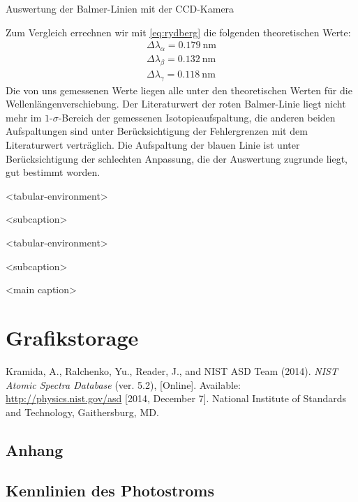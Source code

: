 \documentclass[11pt, a4paper]{article}
\numberwithin{equation}{section}
\begin{document}
\begin{table}[h]
\centering

\caption{Auswertung der Balmer-Linien mit der CCD-Kamera}
\label{tab:balmer_ccd_auswertung}
\end{table}
\noindent
Zum Vergleich errechnen wir mit \eqref{eq:rydberg} die folgenden theoretischen Werte:
\begin{align}
\Delta\lambda_\alpha=\SI{0.179}{\nano\metre}\\
\Delta\lambda_\beta=\SI{0.132}{\nano\metre}\\
\Delta\lambda_\gamma=\SI{0.118}{\nano\metre}
\end{align}
Die von uns gemessenen Werte liegen alle unter den theoretischen Werten für die Wellenlängenverschiebung.
Der Literaturwert der roten Balmer-Linie liegt nicht mehr im $1$-$\sigma$-Bereich der gemessenen Isotopieaufspaltung, die anderen beiden Aufspaltungen sind unter Berücksichtigung der Fehlergrenzen mit dem Literaturwert verträglich.
Die Aufspaltung der blauen Linie ist unter Berücksichtigung der schlechten Anpassung, die der Auswertung zugrunde liegt, gut bestimmt worden.
\clearpage

\begin{table}
\centering
\begin{subtable}{0.5\textwidth}
\centering

<tabular-environment>

\caption{<subcaption>}
\end{subtable}%
\begin{subtable}{0.5\textwidth}
\centering

<tabular-environment>

\caption{<subcaption>}
\end{subtable}

\caption{<main caption>}
\end{table}

\section{Grafikstorage}

\clearpage



\begin{thebibliography}{9}

	Kramida, A., Ralchenko, Yu., Reader, J., and NIST ASD Team (2014).
	\emph{NIST Atomic Spectra Database} (ver. 5.2), [Online].
	Available: \url{http://physics.nist.gov/asd} [2014, December 7].
	National Institute of Standards and Technology, Gaithersburg, MD. 
 
\end{thebibliography}

\begin{appendix}
\section{Anhang}
\subsection{Kennlinien des Photostroms}
\label{app:kennlinien}
\FloatBarrier


\end{appendix}
\end{document}
